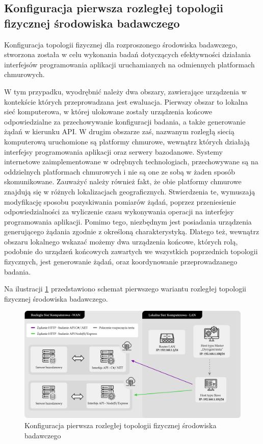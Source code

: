 \subsection*{Konfiguracja pierwsza rozległej topologii fizycznej środowiska badawczego}
\label{sec:rozproszone-srodowisko-badawcze-ver-1}
Konfiguracja topologii fizycznej dla rozproszonego środowiska badawczego, stworzona została w celu wykonania badań dotyczących efektywności działania interfejsów programowania aplikacji uruchamianych na odmiennych platformach chmurowych.

W tym przypadku, wyodrębnić należy dwa obszary, zawierające urządzenia w kontekście których przeprowadzana jest ewaluacja. Pierwszy obszar to lokalna sieć komputerowa, w której ulokowane zostały urządzenia końcowe odpowiedzialne za przechowywanie konfiguracji badania, a także generowanie żądań w kierunku API. W drugim obszarze zaś, nazwanym rozległą siecią komputerową uruchomione są platformy chmurowe, wewnątrz których działają interfejsy programowania aplikacji oraz serwery bazodanowe. Systemy internetowe zaimplementowane w odrębnych technologiach, przechowywane są na oddzielnych platformach chmurowych i nie są one ze sobą w żaden sposób skomunikowane. Zauważyć należy również fakt, że obie platformy chmurowe znajdują się w różnych lokalizacjach geograficznych. Stwierdzenia te, wymuszają modyfikację sposobu pozyskiwania pomiarów żądań, poprzez przeniesienie odpowiedzialności za wyliczenie czasu wykonywania operacji na interfejsy programowania aplikacji. Pomimo tego, niezbędnym jest posiadania urządzenia generującego żądania zgodnie z określoną charakterystyką. Dlatego też, wewnątrz obszaru lokalnego wskazać możemy dwa urządzenia końcowe, których rolą, podobnie do urządzeń końcowych zawartych we wszystkich poprzednich topologii fizycznych, jest generowanie żądań, oraz koordynowanie przeprowadzanego badania.

Na ilustracji \ref{fig:topologia-4} przedstawiono schemat pierwszego wariantu rozległej topologii fizycznej środowiska badawczego.

\begin{figure}[ht]
    \centering
     \includegraphics[width=\linewidth]{rys04/topologia-4.png}
    \caption{Konfiguracja pierwsza rozległej topologii fizycznej środowiska badawczego}
    \label{fig:topologia-4}
\end{figure}

